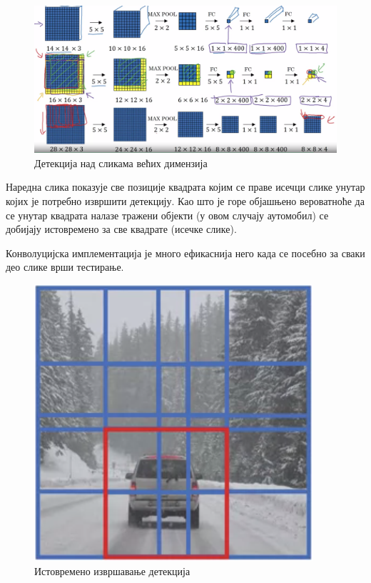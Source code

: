 \documentclass[12pt, а4paper]{article}
\begin{document}
\begin{figure}[H]
  \centering
      \includegraphics[scale=0.3]{slike/ngSlidWConv2.png}
  \caption{Детекција над сликама већих димензија}
  \label{fig:ng_slidWConv2}
\end{figure}

Наредна слика показује све позиције квадрата којим се праве исечци слике
унутар којих је потребно извршити детекцију. Као што је горе објашњено
вероватноће да се унутар квадрата налазе тражени објекти
(у овом случају аутомобил) се добијају истовремено за
све квадрате (исечке слике).

Конволуцијска имплементација је много ефикаснија него када се
посебно за сваки део слике врши тестирање.

\begin{figure}[H]
  \centering
      \includegraphics[scale=0.6]{slike/ngSlidWConv3.png}
  \caption{Истовремено извршавање детекција}
  \label{fig:ng_slidWConv3}
\end{figure}
\end{document}

